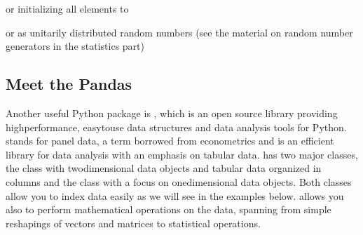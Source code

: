 \documentclass[letterpaper,10pt,english]{sphinxmanual}
\begin{document}
or initializing all elements to

\begin{sphinxVerbatim}[commandchars=\\\{\}]
   
  
     
\end{sphinxVerbatim}

or as unitarily distributed random numbers (see the material on random number generators in the statistics part)

\begin{sphinxVerbatim}[commandchars=\\\{\}]
   
  
   
\end{sphinxVerbatim}


\subsection{Meet the Pandas}
\label{\detokenize{chapter2:meet-the-pandas}}








Another useful Python package is
, which is an open source library
providing high\sphinxhyphen{}performance, easy\sphinxhyphen{}to\sphinxhyphen{}use data structures and data
analysis tools for Python.  stands for panel data, a term borrowed from econometrics and is an efficient library for data analysis with an emphasis on tabular data.
 has two major classes, the  class with two\sphinxhyphen{}dimensional data objects and tabular data organized in columns and the class  with a focus on one\sphinxhyphen{}dimensional data objects. Both classes allow you to index data easily as we will see in the examples below.
 allows you also to perform mathematical operations on the data, spanning from simple reshapings of vectors and matrices to statistical operations.
\end{document}
